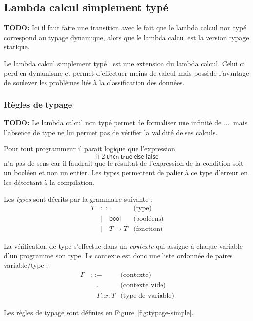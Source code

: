 \documentclass{article}
\newcommand{\TODO}[1]{\textbf{TODO:} #1}
\theoremstyle{definition}
\theoremstyle{remark}
\begin{document}
\subsection{Lambda calcul simplement typé}

\TODO{Ici il faut faire une transition avec le fait que le lambda
  calcul non typé correspond au typage dynamique, alors que le lambda
  calcul est la version typage statique.}


Le lambda calcul simplement typé~\citep{church:simple-type} est une
extension du lambda calcul. Celui ci perd en dynamisme et permet
d'effectuer moins de calcul mais possède l'avantage de soulever les
problèmes liés à la classification des données.


\subsubsection{Règles de typage}

\TODO{Le lambda calcul non typé permet de formaliser une infinité de ....
 mais l'absence de type ne lui permet pas de vérifier la validité de ses
 calculs.}

Pour tout programmeur il parait logique que l'expression
%
\[
 \mathsf{if}\: 2\: \mathsf{then}\: \mathsf{true}\: \mathsf{else}\: \mathsf{false}
\]
%
n'a pas de sens car il faudrait que le résultat de l'expression de la
condition soit un booléen et non un entier. Les types permettent de
palier à ce type d'erreur en les détectant à la compilation.


Les \emph{types} sont décrits par la grammaire suivante :
%
\begin{align*}
  T &::=             & \mbox{(type)} \\
    &|\quad \mathsf{bool} & \mbox{(booléens)} \\
    &|\quad T \rightarrow T   &  \mbox{(fonction)} 
\end{align*}

La vérification de type s'effectue dans un \emph{contexte} qui assigne
à chaque variable d'un programme son type. Le contexte est donc une
liste ordonnée de paires variable/type :
%
\begin{align*}
  \Gamma &::= &\mbox{(contexte)} \\
         &\quad . & \mbox{(contexte vide)} \\
         &\quad \Gamma, x : T & \mbox{(type de variable)} 
\end{align*}

Les règles de typage sont définies en Figure~\ref{fig:typage-simple}.
\end{document}
